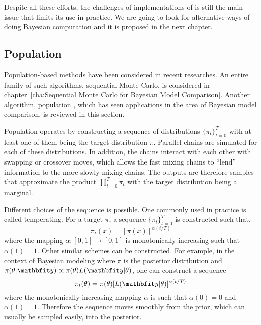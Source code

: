 Despite all these efforts, the challenges of implementations of \rjmcmc is
still the main issue that limits its use in practice. We are going to look for
alternative ways of doing Bayesian computation and it is proposed in the next
chapter.

\subsection{Population \protect\mcmc}
\label{sub:Population mcmc}

Population-based methods have been considered in recent researches. An entire
family of such algorithms, sequential Monte Carlo, is considered in
chapter~\ref{cha:Sequential Monte Carlo for Bayesian Model Comparison}.
Another algorithm, population \mcmc, which has seen applications in the area of
Bayesian model comparison, is reviewed in this section.

Population \mcmc operates by constructing a sequence of distributions
$\{\pi_t\}_{t=0}^T$ with at least one of them being the target distribution
$\pi$. Parallel \mcmc chains are simulated for each of these distributions. In
addition, the chains interact with each other with swapping or crossover
moves, which allows the fast mixing chains to ``lend'' information to the more
slowly mixing chains. The outputs are therefore samples that approximate the
product $\prod_{t=0}^T\pi_t$ with the target distribution being a marginal.

Different choices of the sequence is possible. One commonly used in practice
is called temperating. For a target $\pi$, a sequence $\{\pi_t\}_{t=0}^T$ is
constructed such that,
\begin{equation}
  \pi_t(x) = [\pi(x)]^{\alpha(t/T)}
\end{equation}
where the mapping $\alpha:[0,1]\to[0,1]$ is monotonically increasing such that
$\alpha(1) = 1$. Other similar schemes can be constructed. For example, in the
context of Bayesian modeling where $\pi$ is the posterior distribution and
$\pi(\theta|\data) \propto \pi(\theta)L(\data|\theta)$, one can construct a
sequence
\begin{equation}
  \pi_t(\theta) = \pi(\theta)[L(\data|\theta)]^{\alpha(t/T)}
  \label{eq:power post}
\end{equation}
where the monotonically increasing mapping $\alpha$ is such that $\alpha(0) =
0$ and $\alpha(1) = 1$. Therefore the sequence moves smoothly from the prior,
which can usually be sampled easily, into the posterior.

